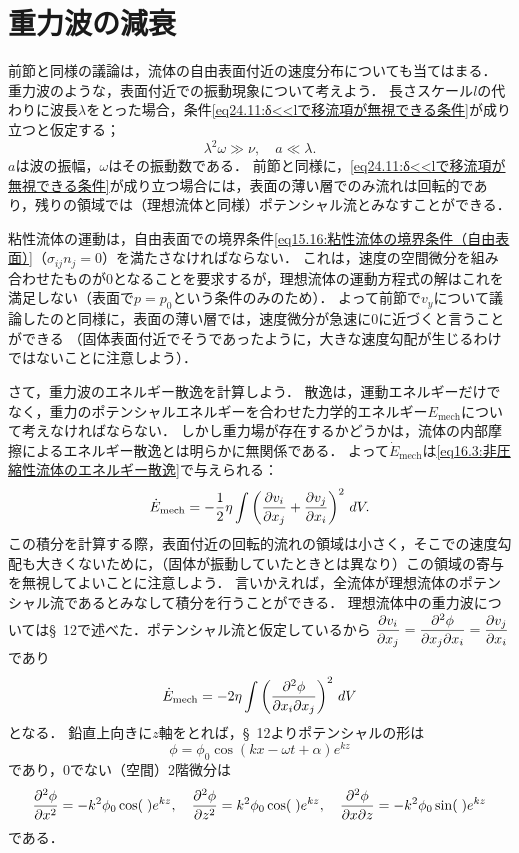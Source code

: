 \section{重力波の減衰}

前節と同様の議論は，流体の自由表面付近の速度分布についても当てはまる．
重力波のような，表面付近での振動現象について考えよう．
長さスケール$l$の代わりに波長$\lambda$をとった場合，条件\eqref{eq24.11:δ<<lで移流項が無視できる条件}が成り立つと仮定する；
\begin{equation}
    \lambda^2\omega \gg \nu, \quad a \ll \lambda.
\end{equation}
$a$は波の振幅，$\omega$はその振動数である．
前節と同様に，\eqref{eq24.11:δ<<lで移流項が無視できる条件}が成り立つ場合には，表面の薄い層でのみ流れは回転的であり，残りの領域では（理想流体と同様）ポテンシャル流とみなすことができる．


粘性流体の運動は，自由表面での境界条件\eqref{eq15.16:粘性流体の境界条件（自由表面）}（$\sigma_{ij}n_j=0$）を満たさなければならない．
これは，速度の空間微分を組み合わせたものが0となることを要求するが，理想流体の運動方程式の解はこれを満足しない（表面で$p=p_0$という条件のみのため）．
よって前節で$v_y$について議論したのと同様に，表面の薄い層では，速度微分が急速に0に近づくと言うことができる
（固体表面付近でそうであったように，大きな速度勾配が生じるわけではないことに注意しよう）．



さて，重力波のエネルギー散逸を計算しよう．
散逸は，運動エネルギーだけでなく，重力のポテンシャルエネルギーを合わせた力学的エネルギー$E_\mathrm{mech}$について考えなければならない．
しかし重力場が存在するかどうかは，流体の内部摩擦によるエネルギー散逸とは明らかに無関係である．
よって$\dot{E}_\mathrm{mech}$は\eqref{eq16.3:非圧縮性流体のエネルギー散逸}で与えられる：
\[
    \dot{E}_\mathrm{mech} = -\frac{1}{2} \eta \int \left( \pdv{v_i}{x_j} + \pdv{v_j}{x_i} \right)^2 \, dV.
\]
この積分を計算する際，表面付近の回転的流れの領域は小さく，そこでの速度勾配も大きくないために，（固体が振動していたときとは異なり）この領域の寄与を無視してよいことに注意しよう．
言いかえれば，全流体が理想流体のポテンシャル流であるとみなして積分を行うことができる．
理想流体中の重力波については\S~12で述べた．ポテンシャル流と仮定しているから
$\dpdv{v_i}{x_j} = \dpdv{\phi}{x_j}{x_i} = \dpdv{v_j}{x_i}$であり
\[
    \dot{E}_\mathrm{mech} = -2\eta \int \left( \pdv{\phi}{x_i}{x_j} \right)^2 \, dV
\]
となる．
鉛直上向きに$z$軸をとれば，\S~12よりポテンシャルの形は
\[
    \phi = \phi_0 \cos(kx-\omega t+ \alpha) e^{kz}
\]
であり，0でない（空間）2階微分は
\[
    \pdv[2]{\phi}{x} = -k^2 \phi_0 \cos(\;)e^{kz}, \quad
    \pdv[2]{\phi}{z} = k^2 \phi_0 \cos(\;)e^{kz}, \quad
    \pdv{\phi}{x}{z} = -k^2 \phi_0 \sin(\;)e^{kz}
\]
である．

